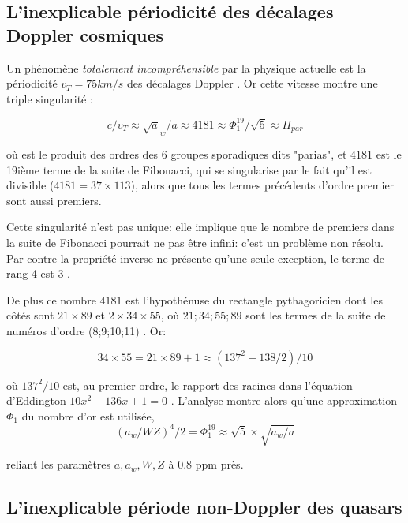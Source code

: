 \documentclass[a4paper,9pt]{article}
\begin{document}
\subsection{L'inexplicable périodicité des décalages Doppler cosmiques} 
Un phénomène \textit{totalement incompréhensible} par la physique actuelle est la périodicité $v_T = 75 km/s$ des décalages Doppler \cite{Tifft}. Or cette vitesse montre une triple singularité :

\begin{equation}
c/v_T \approx \sqrt a_w/a \approx 4181 \approx \Phi_1^{19} / \sqrt 5 \approx \Pi_{par}
 \end{equation}

où est le produit des ordres des 6 groupes sporadiques dits "parias", et $4181$ est le 19ième terme de la suite de Fibonacci, qui se singularise par le fait qu'il est divisible ($4181 = 37 \times 113$), alors que tous les termes précédents d'ordre premier sont aussi premiers. 


Cette singularité n'est pas unique: elle implique que le nombre de premiers dans la suite de Fibonacci pourrait ne pas être infini: c'est un problème non résolu. Par contre la propriété inverse ne présente qu'une seule exception, le terme de rang 4 est 3 \cite{Corbalan}.

De plus ce nombre $4181$ est l'hypothénuse du rectangle pythagoricien dont les côtés sont $21\times 89$ et $2\times 34 \times 55$, où $21;34;55;89$ sont les termes de la suite de numéros d'ordre (8;9;10;11) \cite{Corbalan}. Or:

\begin{equation}
34\times 55  = 21\times 89 + 1 \approx (137^2-138/2)/10 
 \end{equation}

où $137^2/10$ est, au premier ordre, le rapport des racines dans l'équation d'Eddington $10x^2-136x+1=0$ \cite{Eddington}. L'analyse montre alors qu'une approximation $\Phi_1$ du nombre d'or est utilisée, 
\begin{equation}
(a_w /WZ)^4 /2 = \Phi_1^{19} \approx \sqrt 5 \times \sqrt{a_w/a}
 \end{equation}
 
 reliant les paramètres $a, a_w, W, Z$ à 0.8 ppm près.

 
\subsection{L'inexplicable période non-Doppler des quasars}
\end{document}
